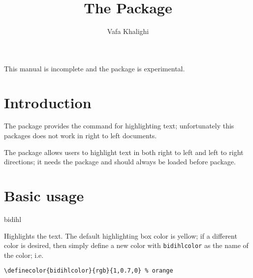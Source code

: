 \documentclass{ltxdoc}
\begin{document}
\title{The  Package}
\author{Vafa Khalighi\\}
\maketitle

\begin{framed}
This manual is incomplete and the package is experimental.
\end{framed}

\tableofcontents

\section{Introduction}
The  package provides the  command for
highlighting text; unfortunately this packages does not work in right to left
documents.

The  package allows users to highlight text in both right to left
and left to right directions; it needs the  package and should always
be loaded before  package.


\section{Basic usage}
\begin{declcs}{bidihl} 
\end{declcs}
Highlights the text. The default highlighting box color is yellow; if a different color is desired, then simply define a new color with
\texttt{bidihlcolor} as the name of the color; i.e.
\begin{verbatim}
\definecolor{bidihlcolor}{rgb}{1,0.7,0} % orange
\end{verbatim}
\end{document}
